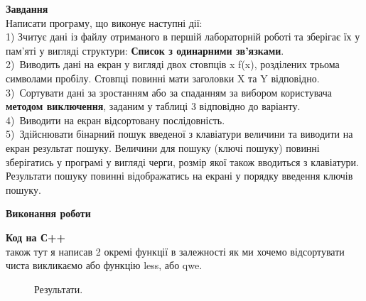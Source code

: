 \documentclass[a4paper,14pt]{extreport}
\begin{document}
\textbf{Завдання}\\
Написати програму, що виконує наступні дії:\\

1) Зчитує дані із файлу отриманого в першій лабораторній роботі та зберігає їх у пам’яті у вигляді структури: \textbf{Список з одинарними зв’язками}.\\

2) Виводить дані на екран у вигляді двох стовпців x   f(x), розділених трьома символами пробілу. Стовпці повинні мати заголовки X та Y відповідно.\\

3) Сортувати дані за зростанням або за спаданням за вибором користувача \textbf{методом виключення}, заданим у таблиці 3 відповідно до варіанту.\\

4) Виводити на екран відсортовану послідовність.\\

5) Здійснювати бінарний пошук введеної з клавіатури величини та виводити на екран результат пошуку. Величини для пошуку (ключі пошуку) повинні зберігатись у програмі у вигляді черги, розмір якої також вводиться з клавіатури. Результати пошуку повинні відображатись на екрані у порядку введення ключів пошуку.\\


\vspace{0.3cm}
\begin{center}\textbf{Виконання роботи}\end{center}
\textbf{Код на С++}\\




також тут я написав 2 окремі функції в залежності як ми хочемо відсортувати чиста викликаємо або функцію less, або qwe.

\begin{figure}[h]
\caption{Результати.}

\end{figure}
\end{document}
